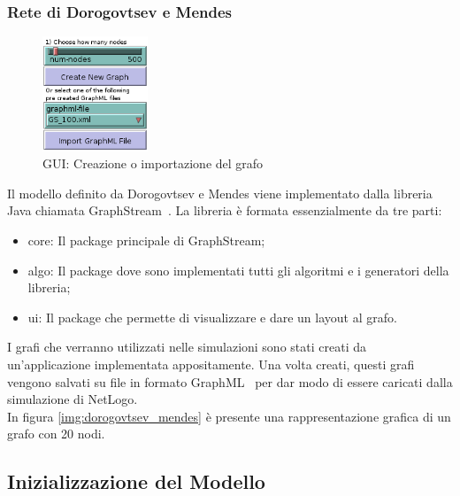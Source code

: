 \subsubsection{Rete di Dorogovtsev e Mendes}
\label{section:graph_topologies_dm}

\begin{figure}
  \vspace*{-25pt}
  \begin{center}
    \includegraphics[width=0.28\textwidth]{img/gui-graph.png}
  \end{center}
 \vspace*{-10pt}
 \caption{GUI: Creazione o importazione del grafo}
 \vspace*{-35pt}
 \label{img:gui_graph}
\end{figure}

Il modello definito da Dorogovtsev e Mendes viene implementato dalla libreria Java chiamata GraphStream~\cite{biblio:graphstream}.
La libreria è formata essenzialmente da tre parti: 
\begin{itemize}
 \item core: Il package principale di GraphStream;
 \item algo: Il package dove sono implementati tutti gli algoritmi e i generatori della libreria;
 \item ui: Il package che permette di visualizzare e dare un layout al grafo.
\end{itemize}
I grafi che verranno utilizzati nelle simulazioni sono stati creati da un'applicazione implementata appositamente.
Una volta creati, questi grafi vengono salvati su file in formato GraphML~\cite{biblio:graphml} per dar modo di 
essere caricati dalla simulazione di NetLogo. \\
In figura \ref{img:dorogovtsev_mendes} è presente una rappresentazione grafica di un grafo con 20 nodi.



\subsection{Inizializzazione del Modello}
\label{section:gui_setup_graph}

